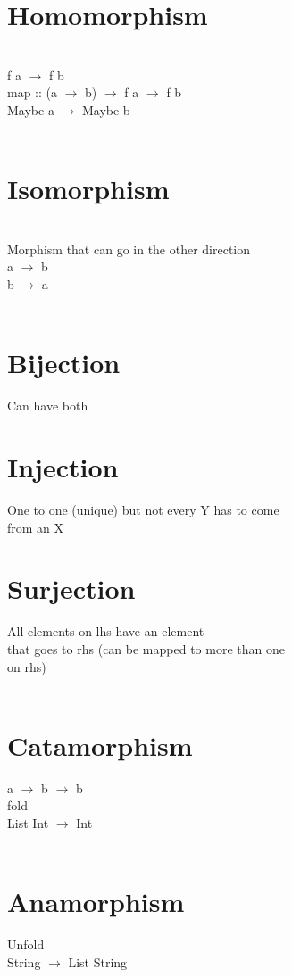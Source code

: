 \documentclass{article}
\begin{document}
\section{Homomorphism}
\\
f a $\rightarrow$ f b
\\
map :: (a $\rightarrow$ b) $\rightarrow$ f a $\rightarrow$ f b
\\
Maybe a $\rightarrow$ Maybe b 
\\
\\
\section{Isomorphism}
\\
Morphism that can go in the other direction
\\
a $\rightarrow$ b 
\\
b $\rightarrow$ a 
\\
\\
\section{Bijection} 
Can have both
\\
\section{Injection}
One to one (unique) but not every Y has to come
\\
from an X
\\
\section{Surjection}
All elements on lhs have an element
\\
that goes to rhs (can be mapped to more than one
\\
on rhs)
\\
\\
\section{Catamorphism}
a $\rightarrow$ b $\rightarrow$ b
\\
fold 
\\
List Int $\rightarrow$ Int
\\
\\
\section{Anamorphism}
Unfold
\\
String $\rightarrow$ List String
\\
\\
\end{document}
